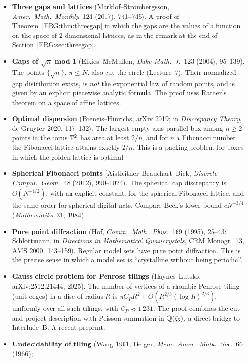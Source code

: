 \begin{itemize}[leftmargin=1.2em,itemsep=0.45em]
  Hausdorff dimension $0$. By the Dani correspondence, Littlewood concerns orbits of the $2$-parameter
  diagonal group on $X_3$.
\item \textbf{Three gaps and lattices} (Marklof--Str\"ombergsson, \emph{Amer.\ Math.\ Monthly}~124 (2017),
  741--745). A proof of Theorem~\ref{ERG:thm:threegap} in which the gaps are the values of a function on the
  space of $2$-dimensional lattices, as in the remark at the end of Section~\ref{ERG:sec:threegap}.
\item \textbf{Gaps of $\sqrt n$ mod 1} (Elkies--McMullen, \emph{Duke Math.\ J.}~123 (2004), 95--139). The
  points $\{\sqrt n\}$, $n\le N$, also cut the circle (Lecture~7). Their normalized gap distribution
  exists, is \emph{not} the exponential law of random points, and is given by an explicit piecewise analytic
  formula. The proof uses Ratner's theorem on a space of affine lattices.
\item \textbf{Optimal dispersion} (Breneis--Hinrichs, arXiv 2019; in \emph{Discrepancy Theory}, de Gruyter
  2020, 117--132). The largest empty axis-parallel box among $n\ge2$ points in the torus $\mathbb{T}^2$ has area at least $2/n$,
  and for $n$ a Fibonacci number the Fibonacci lattice attains exactly $2/n$. This is a packing problem
  for boxes in which the golden lattice is optimal.
\item \textbf{Spherical Fibonacci points} (Aistleitner--Brauchart--Dick, \emph{Discrete Comput.\ Geom.}~48
  (2012), 990--1024). The spherical cap discrepancy is $O(N^{-1/2})$, with an explicit constant, for the spherical
  Fibonacci lattice, and the same order for spherical digital nets. Compare Beck's lower bound $cN^{-3/4}$
  (\emph{Mathematika}~31, 1984).
\item \textbf{Pure point diffraction} (Hof, \emph{Comm.\ Math.\ Phys.}~169 (1995), 25--43; Schlottmann,
  in \emph{Directions in Mathematical Quasicrystals}, CRM Monogr.~13, AMS 2000, 143--159). Regular model
  sets have pure point diffraction. This is the precise sense in which a model set is ``crystalline
  without being periodic''.
\item \textbf{Gauss circle problem for Penrose tilings} (Haynes--Lutsko, arXiv:2512.21444, 2025). The number of
  vertices of a rhombic Penrose tiling (unit edges) in a disc of radius $R$ is
  $\pi C_PR^2+O(R^{2/3}(\log R)^{2/3})$, uniformly over all such tilings, with $C_P\approx1.231$. The proof
  combines the cut and project description with Poisson summation in $\mathbb{Q}(\zeta_5)$, a direct bridge to
  Interlude~B. A recent preprint.
\item \textbf{Undecidability of tiling} (Wang 1961; Berger, \emph{Mem.\ Amer.\ Math.\ Soc.}~66 (1966);

\end{itemize}
